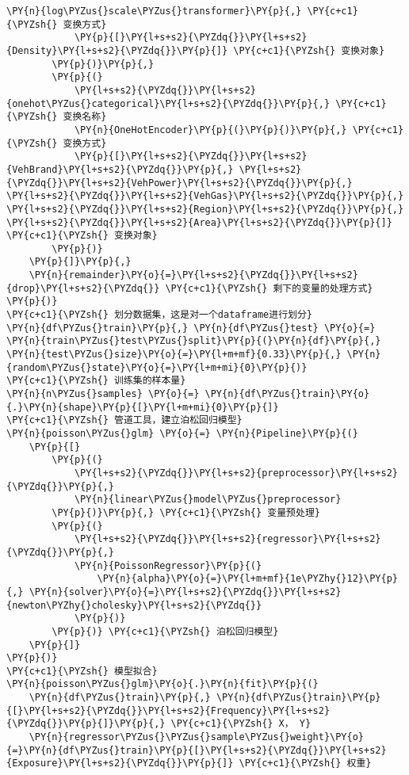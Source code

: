 \begin{Verbatim}[commandchars=\\\{\}]
            \PY{n}{log\PYZus{}scale\PYZus{}transformer}\PY{p}{,} \PY{c+c1}{\PYZsh{} 变换方式}
            \PY{p}{[}\PY{l+s+s2}{\PYZdq{}}\PY{l+s+s2}{Density}\PY{l+s+s2}{\PYZdq{}}\PY{p}{]} \PY{c+c1}{\PYZsh{} 变换对象}
        \PY{p}{)}\PY{p}{,}
        \PY{p}{(}
            \PY{l+s+s2}{\PYZdq{}}\PY{l+s+s2}{onehot\PYZus{}categorical}\PY{l+s+s2}{\PYZdq{}}\PY{p}{,} \PY{c+c1}{\PYZsh{} 变换名称}
            \PY{n}{OneHotEncoder}\PY{p}{(}\PY{p}{)}\PY{p}{,} \PY{c+c1}{\PYZsh{} 变换方式}
            \PY{p}{[}\PY{l+s+s2}{\PYZdq{}}\PY{l+s+s2}{VehBrand}\PY{l+s+s2}{\PYZdq{}}\PY{p}{,} \PY{l+s+s2}{\PYZdq{}}\PY{l+s+s2}{VehPower}\PY{l+s+s2}{\PYZdq{}}\PY{p}{,} \PY{l+s+s2}{\PYZdq{}}\PY{l+s+s2}{VehGas}\PY{l+s+s2}{\PYZdq{}}\PY{p}{,} \PY{l+s+s2}{\PYZdq{}}\PY{l+s+s2}{Region}\PY{l+s+s2}{\PYZdq{}}\PY{p}{,} \PY{l+s+s2}{\PYZdq{}}\PY{l+s+s2}{Area}\PY{l+s+s2}{\PYZdq{}}\PY{p}{]} \PY{c+c1}{\PYZsh{} 变换对象}
        \PY{p}{)}
    \PY{p}{]}\PY{p}{,}
    \PY{n}{remainder}\PY{o}{=}\PY{l+s+s2}{\PYZdq{}}\PY{l+s+s2}{drop}\PY{l+s+s2}{\PYZdq{}} \PY{c+c1}{\PYZsh{} 剩下的变量的处理方式}
\PY{p}{)}
\PY{c+c1}{\PYZsh{} 划分数据集，这是对一个dataframe进行划分}
\PY{n}{df\PYZus{}train}\PY{p}{,} \PY{n}{df\PYZus{}test} \PY{o}{=} \PY{n}{train\PYZus{}test\PYZus{}split}\PY{p}{(}\PY{n}{df}\PY{p}{,} \PY{n}{test\PYZus{}size}\PY{o}{=}\PY{l+m+mf}{0.33}\PY{p}{,} \PY{n}{random\PYZus{}state}\PY{o}{=}\PY{l+m+mi}{0}\PY{p}{)}
\PY{c+c1}{\PYZsh{} 训练集的样本量}
\PY{n}{n\PYZus{}samples} \PY{o}{=} \PY{n}{df\PYZus{}train}\PY{o}{.}\PY{n}{shape}\PY{p}{[}\PY{l+m+mi}{0}\PY{p}{]}
\PY{c+c1}{\PYZsh{} 管道工具，建立泊松回归模型}
\PY{n}{poisson\PYZus{}glm} \PY{o}{=} \PY{n}{Pipeline}\PY{p}{(}
    \PY{p}{[}
        \PY{p}{(}
            \PY{l+s+s2}{\PYZdq{}}\PY{l+s+s2}{preprocessor}\PY{l+s+s2}{\PYZdq{}}\PY{p}{,} 
            \PY{n}{linear\PYZus{}model\PYZus{}preprocessor}
        \PY{p}{)}\PY{p}{,} \PY{c+c1}{\PYZsh{} 变量预处理}
        \PY{p}{(}
            \PY{l+s+s2}{\PYZdq{}}\PY{l+s+s2}{regressor}\PY{l+s+s2}{\PYZdq{}}\PY{p}{,} 
            \PY{n}{PoissonRegressor}\PY{p}{(}
                \PY{n}{alpha}\PY{o}{=}\PY{l+m+mf}{1e\PYZhy{}12}\PY{p}{,} \PY{n}{solver}\PY{o}{=}\PY{l+s+s2}{\PYZdq{}}\PY{l+s+s2}{newton\PYZhy{}cholesky}\PY{l+s+s2}{\PYZdq{}}
            \PY{p}{)}
        \PY{p}{)} \PY{c+c1}{\PYZsh{} 泊松回归模型}
    \PY{p}{]}
\PY{p}{)}
\PY{c+c1}{\PYZsh{} 模型拟合}
\PY{n}{poisson\PYZus{}glm}\PY{o}{.}\PY{n}{fit}\PY{p}{(}
    \PY{n}{df\PYZus{}train}\PY{p}{,} \PY{n}{df\PYZus{}train}\PY{p}{[}\PY{l+s+s2}{\PYZdq{}}\PY{l+s+s2}{Frequency}\PY{l+s+s2}{\PYZdq{}}\PY{p}{]}\PY{p}{,} \PY{c+c1}{\PYZsh{} X， Y}
    \PY{n}{regressor\PYZus{}\PYZus{}sample\PYZus{}weight}\PY{o}{=}\PY{n}{df\PYZus{}train}\PY{p}{[}\PY{l+s+s2}{\PYZdq{}}\PY{l+s+s2}{Exposure}\PY{l+s+s2}{\PYZdq{}}\PY{p}{]} \PY{c+c1}{\PYZsh{} 权重}

\end{Verbatim}
